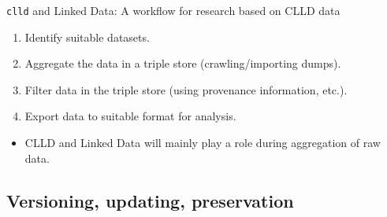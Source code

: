 \documentclass{beamer}
\begin{document}




\begin{frame}{\texttt{clld} and Linked Data: A workflow for research based on CLLD data}
\begin{enumerate}
\item Identify suitable datasets.
\item Aggregate the data in a triple store (crawling/importing dumps).
\item Filter data in the triple store (using provenance information, etc.).
\item Export data to suitable format for analysis.
\end{enumerate}

\begin{itemize}
\item CLLD and Linked Data will mainly play a role during aggregation of raw data.
\end{itemize}
\end{frame}


\subsection{Versioning, updating, preservation}

\end{document}
